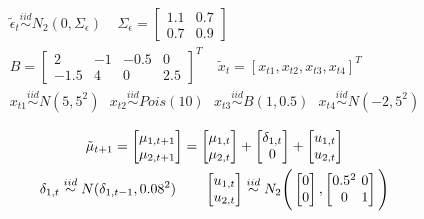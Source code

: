 \documentclass[twoside,11pt]{article}
\begin{document}
\begin{equation} \label{eq:modelregression}
\begin{gathered}
\tilde{\epsilon}_t\stackrel{iid}\sim N_2(0,\Sigma_\epsilon)\ \ \ \ \ \Sigma_\epsilon=\begin{bmatrix}
1.1 & 0.7  \\
0.7 & 0.9
\end{bmatrix} \\
B=\begin{bmatrix}
2 & -1 & -0.5 & 0 \\
-1.5 & 4 & 0 & 2.5
\end{bmatrix}^T \ \ \ \ \
\tilde{x}_t=[x_{t1},x_{t2},x_{t3},x_{t4}]^T\\
x_{t1}\stackrel{iid}\sim N(5,5^2)\ \ \  x_{t2}\stackrel{iid}\sim Pois(10)\ \ \ x_{t3}\stackrel{iid}\sim B(1,0.5)\ \ \  x_{t4}\stackrel{iid}\sim N(-2,5^2)
\end{gathered}
\end{equation}

\begin{equation} \label{eq:sim-mu}
\begin{gathered}
\tilde{\mu}_{t+1}=\begin{bmatrix}
\mu_{1,t+1}  \\
\mu_{2,t+1}
\end{bmatrix}=\begin{bmatrix}
\mu_{1,t}  \\
\mu_{2,t}
\end{bmatrix}+\begin{bmatrix}
\delta_{1,t}  \\
0
\end{bmatrix}+\begin{bmatrix}
u_{1,t}  \\
u_{2,t}
\end{bmatrix}\\
\delta_{1,t}\stackrel{iid}\sim N(\delta_{1,t-1},0.08^2)\quad\quad
\begin{bmatrix}
u_{1,t}  \\
u_{2,t}
\end{bmatrix}\stackrel{iid}\sim N_2\Bigg(
\begin{bmatrix}
0  \\
0
\end{bmatrix},
\begingroup %
\setlength\arraycolsep{1.8pt}
\begin{bmatrix}
0.5^2&0\\
0&1
\end{bmatrix}
\endgroup\Bigg)
\end{gathered}
\end{equation}
\end{document}
